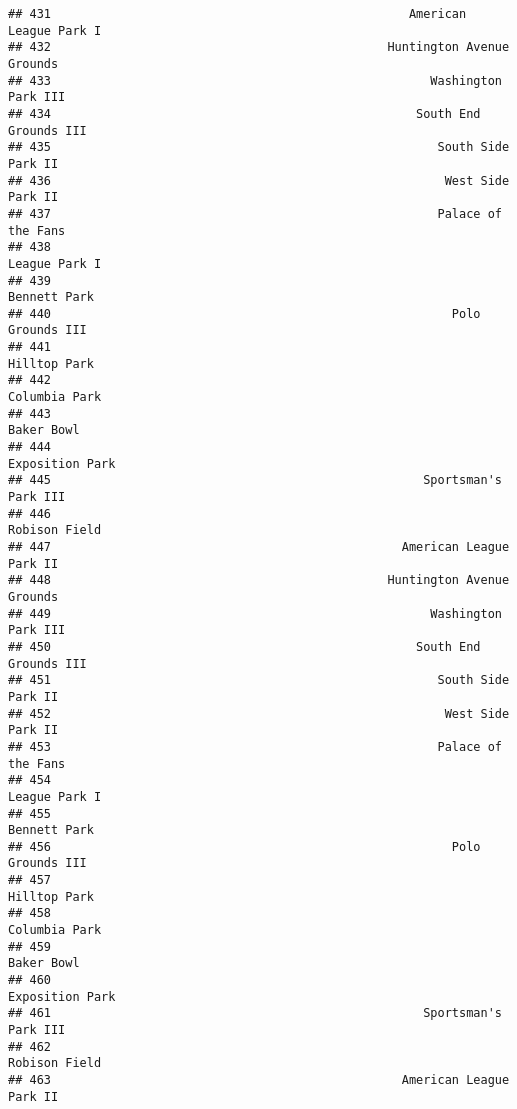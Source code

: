 \documentclass[]{article}
\begin{document}
\begin{verbatim}
## 431                                                  American League Park I
## 432                                               Huntington Avenue Grounds
## 433                                                     Washington Park III
## 434                                                   South End Grounds III
## 435                                                      South Side Park II
## 436                                                       West Side Park II
## 437                                                      Palace of the Fans
## 438                                                           League Park I
## 439                                                            Bennett Park
## 440                                                        Polo Grounds III
## 441                                                            Hilltop Park
## 442                                                           Columbia Park
## 443                                                              Baker Bowl
## 444                                                         Exposition Park
## 445                                                    Sportsman's Park III
## 446                                                           Robison Field
## 447                                                 American League Park II
## 448                                               Huntington Avenue Grounds
## 449                                                     Washington Park III
## 450                                                   South End Grounds III
## 451                                                      South Side Park II
## 452                                                       West Side Park II
## 453                                                      Palace of the Fans
## 454                                                           League Park I
## 455                                                            Bennett Park
## 456                                                        Polo Grounds III
## 457                                                            Hilltop Park
## 458                                                           Columbia Park
## 459                                                              Baker Bowl
## 460                                                         Exposition Park
## 461                                                    Sportsman's Park III
## 462                                                           Robison Field
## 463                                                 American League Park II

\end{verbatim}
\end{document}
